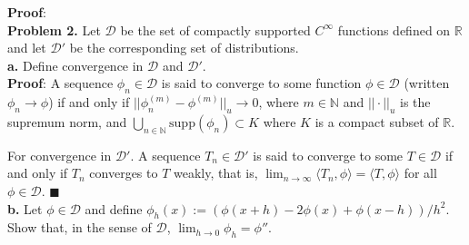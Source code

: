 \documentclass[11pt]{article}
\begin{document}
{\bf Proof}: 
\\[16pt]



{\bf Problem 2.} Let $\mathcal{D}$ be the set of compactly supported $C^\infty$ functions defined on $\mathbb{R}$ and let $\mathcal{D}'$ be the corresponding set of distributions. 
\\[4pt]


{\bf a.} Define convergence in $\mathcal{D}$ and $\mathcal{D}'$. 
\\[8pt]


{\bf Proof}: A sequence $\phi_n \in \mathcal{D}$ is said to converge to some function $\phi \in \mathcal{D}$ (written $\phi_n \to \phi$) if and only if $||\phi^{(m)}_n - \phi^{(m)}||_u \to 0$, where $m\in\mathbb{N}$ and $||\cdot ||_u$ is the supremum norm, and $\bigcup_{n\in\mathbb{N}} \text{supp} (\phi_n) \subset K$ where $K$ is a compact subset of $\mathbb{R}$.

For convergence in $\mathcal{D}'$. A sequence $T_n \in \mathcal{D}'$ is said to converge to some $T\in\mathcal{D}$ if and only if $T_n$ converges to $T$ weakly, that is, $\lim_{n\to\infty} \langle T_n,\phi\rangle = \langle T, \phi \rangle$ for all $\phi \in \mathcal{D}$. $\blacksquare$ 
\\[16pt]



{\bf b.} Let $\phi\in\mathcal{D}$ and define $\phi_h(x) := (\phi(x+h) - 2\phi(x) + \phi(x-h))/h^2$. Show that, in the sense of $\mathcal{D}$, $\lim_{h\to 0} \phi_h = \phi''$. 
\\[8pt]
\end{document}
